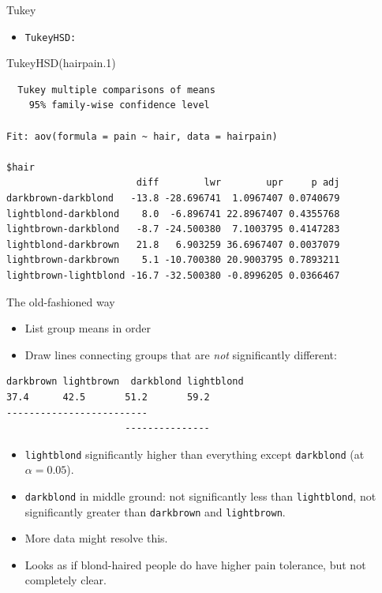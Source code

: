 \documentclass[
  ignorenonframetext,
]{beamer}
\newenvironment{Shaded}{\begin{snugshade}}{\end{snugshade}}
\newcommand{\FloatTok}[1]{\textcolor[rgb]{0.68,0.00,0.00}{#1}}
\newcommand{\FunctionTok}[1]{\textcolor[rgb]{0.28,0.35,0.67}{#1}}
\newcommand{\NormalTok}[1]{\textcolor[rgb]{0.00,0.23,0.31}{#1}}
\providecommand{\tightlist}{%
  \setlength{\itemsep}{0pt}\setlength{\parskip}{0pt}}\usepackage{longtable,booktabs,array}
\begin{document}
\begin{frame}[fragile]{Tukey}
\protect\hypertarget{tukey}{}
\begin{itemize}
\tightlist
\item
  \texttt{TukeyHSD:}
\end{itemize}

\footnotesize

\begin{Shaded}
\begin{Highlighting}[]
\FunctionTok{TukeyHSD}\NormalTok{(hairpain}\FloatTok{.1}\NormalTok{)}
\end{Highlighting}
\end{Shaded}

\begin{verbatim}
  Tukey multiple comparisons of means
    95% family-wise confidence level

Fit: aov(formula = pain ~ hair, data = hairpain)

$hair
                       diff        lwr        upr     p adj
darkbrown-darkblond   -13.8 -28.696741  1.0967407 0.0740679
lightblond-darkblond    8.0  -6.896741 22.8967407 0.4355768
lightbrown-darkblond   -8.7 -24.500380  7.1003795 0.4147283
lightblond-darkbrown   21.8   6.903259 36.6967407 0.0037079
lightbrown-darkbrown    5.1 -10.700380 20.9003795 0.7893211
lightbrown-lightblond -16.7 -32.500380 -0.8996205 0.0366467
\end{verbatim}

\normalsize
\end{frame}

\begin{frame}[fragile]{The old-fashioned way}
\protect\hypertarget{the-old-fashioned-way}{}
\begin{itemize}
\item
  List group means in order
\item
  Draw lines connecting groups that are \emph{not} significantly
  different:
\end{itemize}

\begin{verbatim}
darkbrown lightbrown  darkblond lightblond
37.4      42.5       51.2       59.2
-------------------------
                     ---------------
\end{verbatim}

\begin{itemize}
\item
  \texttt{lightblond} significantly higher than everything except
  \texttt{darkblond} (at \(\alpha=0.05\)).
\item
  \texttt{darkblond} in middle ground: not significantly less than
  \texttt{lightblond}, not significantly greater than \texttt{darkbrown}
  and \texttt{lightbrown}.
\item
  More data might resolve this.
\item
  Looks as if blond-haired people do have higher pain tolerance, but not
  completely clear.
\end{itemize}
\end{frame}
\end{document}
